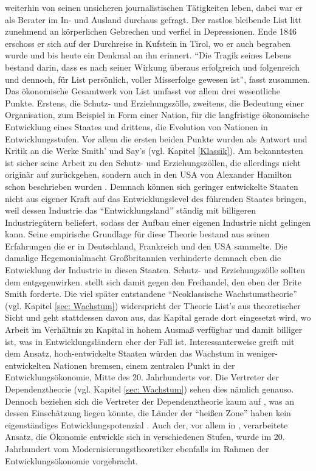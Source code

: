 weiterhin von seinen unsicheren journalistischen Tätigkeiten leben, dabei war er als Berater im In- und Ausland durchaus gefragt. Der rastlos bleibende List litt zunehmend an körperlichen Gebrechen und verfiel in Depressionen. Ende 1846 erschoss er sich auf der Durchreise in Kufstein in Tirol, wo er auch begraben wurde und bis heute ein Denkmal an ihn erinnert. "`Die Tragik seines Lebens bestand darin, dass es nach seiner Wirkung überaus erfolgreich und folgenreich und dennoch, für List persönlich, voller Misserfolge gewesen ist"', fasst \textcite[S. 237]{Hauser1989} zusammen.
Das ökonomische Gesamtwerk von List umfasst vor allem drei wesentliche Punkte. Erstens, die Schutz- und Erziehungszölle, zweitens, die Bedeutung einer Organisation, zum Beispiel in Form einer Nation, für die langfristige ökonomische Entwicklung eines Staates und drittens, die Evolution von Nationen in Entwicklungsstufen. Vor allem die ersten beiden Punkte wurden als Antwort und Kritik an die Werke Smith' und Say's (vgl. Kapitel \ref{Klassik}). Am bekanntesten ist sicher seine Arbeit zu den Schutz- und Erziehungszöllen, die allerdings nicht originär auf \textcite{List1840, List1841} zurückgehen, sondern auch in den USA von Alexander Hamilton schon beschrieben wurden \parencite[S. 243]{Hauser1989}. Demnach können sich geringer entwickelte Staaten nicht aus eigener Kraft auf das Entwicklungslevel des führenden Staates bringen, weil dessen Industrie das "`Entwicklungsland"' ständig mit billigeren Industriegütern beliefert, sodass der Aufbau einer eigenen Industrie nicht gelingen kann. Seine empirische Grundlage für diese Theorie bestand aus seinen Erfahrungen die er in Deutschland, Frankreich und den USA sammelte. Die damalige Hegemonialmacht Großbritannien verhinderte demnach eben die Entwicklung der Industrie in diesen Staaten. Schutz- und Erziehungszölle sollten dem entgegenwirken. \textcite{List1841} stellt sich damit gegen den Freihandel, den eben der Brite Smith forderte. Die viel später entstandene "`Neoklassische Wachstumstheorie"' (vgl. Kapitel \ref{sec: Wachstum}) widerspricht der Theorie List's aus theoretischer Sicht und geht stattdessen davon aus, das Kapital gerade dort eingesetzt wird, wo Arbeit im Verhältnis zu Kapital in hohem Ausmaß verfügbar und damit billiger ist, was in Entwicklungsländern eher der Fall ist. Interessanterweise greift \textcite{List1841} mit dem Ansatz, hoch-entwickelte Staaten würden das Wachstum in weniger-entwickelten Nationen bremsen, einem zentralen Punkt in der Entwicklungsökonomie, Mitte des 20. Jahrhunderts vor. Die Vertreter der Dependenztheorie (vgl. Kapitel \ref{sec: Wachstum}) sehen dies nämlich genauso. Dennoch beziehen sich die Vertreter der Dependenztheorie kaum auf \textcite{List1841}, was an dessen Einschätzung liegen könnte, die Länder der "`heißen Zone"' haben kein eigenständiges Entwicklungspotenzial \parencite[S. 96]{Bachinger2005}. Auch der, vor allem in \textcite{List1840}, verarbeitete Ansatz, die Ökonomie entwickle sich in verschiedenen Stufen, wurde im 20. Jahrhundert vom Modernisierungstheoretiker \textcite{Rostow1960} ebenfalls im Rahmen der Entwicklungsökonomie vorgebracht.
